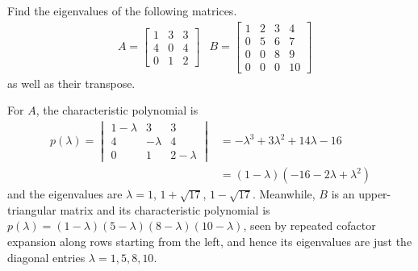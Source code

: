 \begin{Exercise}
Find the eigenvalues of the following matrices.
\begin{align*}
&A =
\begin{bmatrix}
1 & 3 & 3\\
4 & 0 & 4\\
0 & 1 & 2
\end{bmatrix}
&B =
\begin{bmatrix}
1 & 2 & 3 & 4\\
0 & 5 & 6 & 7\\
0 & 0 & 8 & 9\\
0 & 0 & 0 & 10
\end{bmatrix}
\end{align*}
as well as their transpose.
\end{Exercise}
\begin{Answer}
For $A$, the characteristic polynomial is 
\begin{align*}
p(\lambda) = \begin{vmatrix}
1-\lambda & 3 & 3\\
4 & -\lambda & 4\\
0 & 1 & 2-\lambda  
\end{vmatrix}
&= -\lambda^3 + 3\lambda^2 + 14\lambda - 16 \\
&= (1-\lambda)(-16-2\lambda+\lambda^2) 
\end{align*}
and the eigenvalues are $\lambda = 1$, $1+\sqrt{17}$, $1-\sqrt{17}$. Meanwhile, $B$ is an upper-triangular matrix and its characteristic polynomial is $p(\lambda) = (1-\lambda)(5-\lambda)(8-\lambda)(10-\lambda)$, seen by repeated cofactor expansion along rows starting from the left, and hence its eigenvalues are just the diagonal entries $\lambda = 1,5,8,10$.
\end{Answer}

